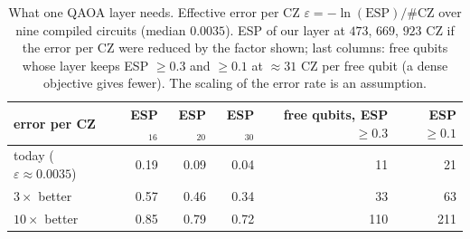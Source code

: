 \begin{table}[t]
\centering\footnotesize\setlength{\tabcolsep}{4pt}
\caption{ What one QAOA layer needs. Effective error per CZ $\varepsilon=-\ln(\mathrm{ESP})/\#\mathrm{CZ}$ over nine compiled circuits (median $0.0035$). ESP of our layer at $473$, $669$, $923$ CZ if the error per CZ were reduced by the factor shown; last columns: free qubits whose layer keeps ESP $\ge0.3$ and $\ge0.1$ at $\approx31$ CZ per free qubit (a dense objective gives fewer). The scaling of the error rate is an assumption.}\label{tab:core_hw}
\begin{tabular}{lrrrrr}
\toprule
error per CZ & ESP$_{16}$ & ESP$_{20}$ & ESP$_{30}$ & free qubits, ESP$\ge0.3$ & ESP$\ge0.1$\\
\midrule
today ($\varepsilon\approx0.0035$) & 0.19 & 0.09 & 0.04 & 11 & 21\\
$3\times$ better & 0.57 & 0.46 & 0.34 & 33 & 63\\
$10\times$ better & 0.85 & 0.79 & 0.72 & 110 & 211\\
\bottomrule
\end{tabular}
\end{table}
